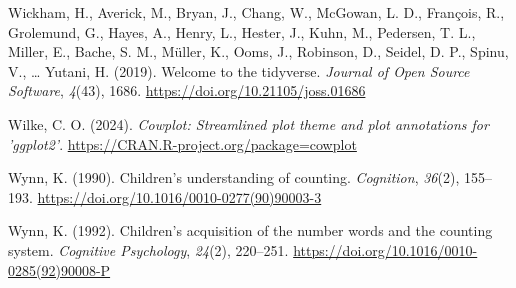 \documentclass[
  man,floatsintext]{apa7}
\newlength{\cslhangindent}
\newlength{\cslentryspacingunit} %
\newenvironment{CSLReferences}[2] %
 {%
  \setlength{\parindent}{0pt}
  \ifodd #1
  \let\oldpar\par
  \def\par{\hangindent=\cslhangindent\oldpar}
  \fi
  \setlength{\parskip}{#2\cslentryspacingunit}
 }%
 {}
\begin{document}
\begin{CSLReferences}{1}{0}
\leavevmode{}%
Wickham, H., Averick, M., Bryan, J., Chang, W., McGowan, L. D., François, R., Grolemund, G., Hayes, A., Henry, L., Hester, J., Kuhn, M., Pedersen, T. L., Miller, E., Bache, S. M., Müller, K., Ooms, J., Robinson, D., Seidel, D. P., Spinu, V., \ldots{} Yutani, H. (2019). Welcome to the {tidyverse}. \emph{Journal of Open Source Software}, \emph{4}(43), 1686. \url{https://doi.org/10.21105/joss.01686}

\leavevmode{}%
Wilke, C. O. (2024). \emph{Cowplot: Streamlined plot theme and plot annotations for 'ggplot2'}. \url{https://CRAN.R-project.org/package=cowplot}

\leavevmode{}%
Wynn, K. (1990). Children's understanding of counting. \emph{Cognition}, \emph{36}(2), 155--193. \url{https://doi.org/10.1016/0010-0277(90)90003-3}

\leavevmode{}%
Wynn, K. (1992). Children's acquisition of the number words and the counting system. \emph{Cognitive Psychology}, \emph{24}(2), 220--251. \url{https://doi.org/10.1016/0010-0285(92)90008-P}

\end{CSLReferences}
\end{document}
